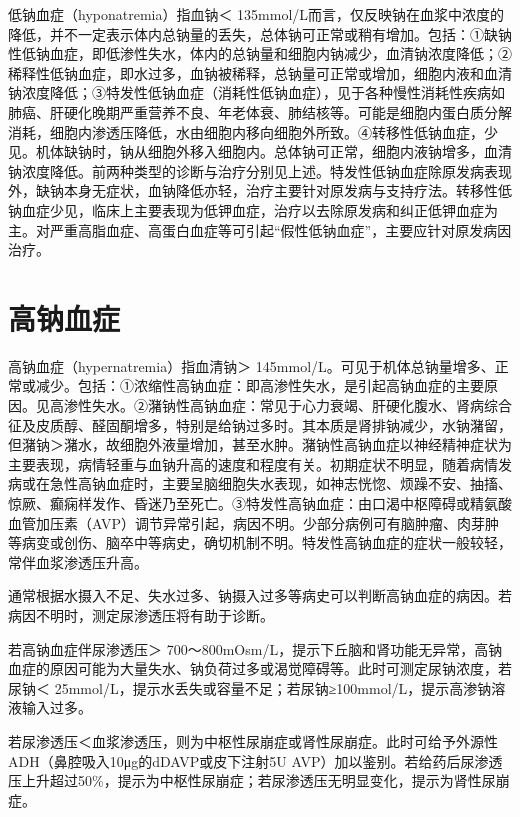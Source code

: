 低钠血症（hyponatremia）指血钠＜
135mmol/L而言，仅反映钠在血浆中浓度的降低，并不一定表示体内总钠量的丢失，总体钠可正常或稍有增加。包括：①缺钠性低钠血症，即低渗性失水，体内的总钠量和细胞内钠减少，血清钠浓度降低；②稀释性低钠血症，即水过多，血钠被稀释，总钠量可正常或增加，细胞内液和血清钠浓度降低；③特发性低钠血症（消耗性低钠血症），见于各种慢性消耗性疾病如肺癌、肝硬化晚期严重营养不良、年老体衰、肺结核等。可能是细胞内蛋白质分解消耗，细胞内渗透压降低，水由细胞内移向细胞外所致。④转移性低钠血症，少见。机体缺钠时，钠从细胞外移入细胞内。总体钠可正常，细胞内液钠增多，血清钠浓度降低。前两种类型的诊断与治疗分别见上述。特发性低钠血症除原发病表现外，缺钠本身无症状，血钠降低亦轻，治疗主要针对原发病与支持疗法。转移性低钠血症少见，临床上主要表现为低钾血症，治疗以去除原发病和纠正低钾血症为主。对严重高脂血症、高蛋白血症等可引起“假性低钠血症”，主要应针对原发病因治疗。

\protect\hypertarget{text00193.html}{}{}

\section{高钠血症}

高钠血症（hypernatremia）指血清钠＞
145mmol/L。可见于机体总钠量增多、正常或减少。包括：①浓缩性高钠血症：即高渗性失水，是引起高钠血症的主要原因。见高渗性失水。②潴钠性高钠血症：常见于心力衰竭、肝硬化腹水、肾病综合征及皮质醇、醛固酮增多，特别是给钠过多时。其本质是肾排钠减少，水钠潴留，但潴钠＞潴水，故细胞外液量增加，甚至水肿。潴钠性高钠血症以神经精神症状为主要表现，病情轻重与血钠升高的速度和程度有关。初期症状不明显，随着病情发病或在急性高钠血症时，主要呈脑细胞失水表现，如神志恍惚、烦躁不安、抽搐、惊厥、癫痫样发作、昏迷乃至死亡。③特发性高钠血症：由口渴中枢障碍或精氨酸血管加压素（AVP）调节异常引起，病因不明。少部分病例可有脑肿瘤、肉芽肿等病变或创伤、脑卒中等病史，确切机制不明。特发性高钠血症的症状一般较轻，常伴血浆渗透压升高。

通常根据水摄入不足、失水过多、钠摄入过多等病史可以判断高钠血症的病因。若病因不明时，测定尿渗透压将有助于诊断。

若高钠血症伴尿渗透压＞
700～800mOsm/L，提示下丘脑和肾功能无异常，高钠血症的原因可能为大量失水、钠负荷过多或渴觉障碍等。此时可测定尿钠浓度，若尿钠＜
25mmol/L，提示水丢失或容量不足；若尿钠≥100mmol/L，提示高渗钠溶液输入过多。

若尿渗透压＜血浆渗透压，则为中枢性尿崩症或肾性尿崩症。此时可给予外源性ADH（鼻腔吸入10μg的dDAVP或皮下注射5U
AVP）加以鉴别。若给药后尿渗透压上升超过50\%，提示为中枢性尿崩症；若尿渗透压无明显变化，提示为肾性尿崩症。


